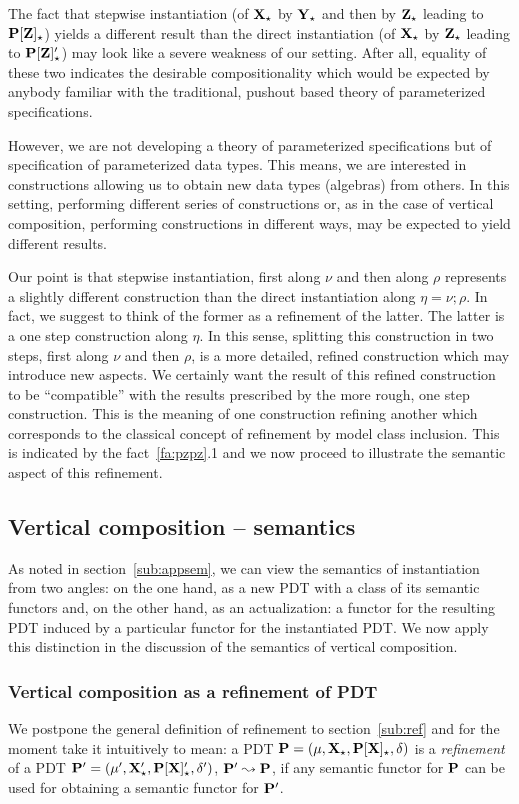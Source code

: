 The fact that stepwise instantiation (of $\thr X_\cons$ by $\thr Y_\cons$ and then by
$\thr Z_\cons$ leading to $\thr{P[Z]_\cons}$) yields a different result than the direct instantiation
(of $\thr X_\cons$ by $\thr{Z_\cons}$ leading to $\thr{P[Z]'_\cons}$) may look like a severe weakness of our
setting. After all, equality of these two indicates the desirable
compositionality which would be expected by anybody familiar with the
traditional, pushout based theory of parameterized specifications. 

However,
we are not developing a theory of parameterized specifications but of
specification of parameterized data types. This means, we are interested in
constructions allowing us to obtain new data types (algebras) from others. In
this setting, performing different series of constructions or, as in the case
of vertical composition, performing constructions in different ways, may be
expected to yield different results. 

Our point is that stepwise instantiation, first along $\nu$ and then along
$\rho$ represents a slightly different construction than the direct instantiation
along $\eta=\nu;\rho$. In fact, we suggest to think of the former as a refinement
of the latter. The latter is a one step construction along $\eta$. In this
sense, splitting this construction in two steps, first along $\nu$ and then
$\rho$, is a more detailed, refined construction which may introduce new
aspects. We certainly want the result of this refined construction to be
``compatible'' with the results prescribed by the more rough, one step
construction. This is the meaning of one construction refining another which
corresponds to the classical concept of refinement by model class
inclusion. This is indicated by the fact~\ref{fa:pzpz}.1 and we now
proceed to illustrate the semantic aspect of this refinement.

\subsection{Vertical composition -- semantics}\label{sub:vcsem}
%
As noted in section~\ref{sub:appsem}, we can view the semantics of
instantiation from two angles: on the one hand, as a new PDT with a class of
its semantic functors and, on the other hand, as an actualization: a functor
for the resulting PDT induced by a
particular functor for the instantiated PDT. We now apply this distinction in
the discussion of the semantics of vertical composition.

\subsubsection{Vertical composition as a refinement of PDT}\label{sub:vertref}
We postpone the general definition of refinement to section~\ref{sub:ref} and for
the moment take it intuitively to mean:
a PDT  $\thr P=\pdt$ is a {\em
refinement} of a PDT  $\thr
P'=\pdtsp{\mu'}{\delta'}{\thr{X'_\cons}}{\thr{P[X]'_\cons}}$, $\thr
P'\leadsto \thr P$, if any semantic 
functor for $\thr P$ can be used for obtaining 
a semantic functor for $\thr P'$.

